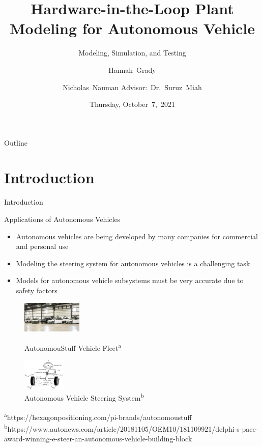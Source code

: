 \documentclass{beamer}
\title[HIL Plant Modeling]{Hardware-in-the-Loop Plant Modeling for Autonomous
  Vehicle}
\subtitle{Modeling, Simulation, and Testing}
\author[H.~Grady, N.~Nauman]{Hannah~Grady \and Nicholas~Nauman 
\linebreak Advisor:~Dr.~Suruz~Miah}
\institute[Bradley University] %
{
  Department of Electrical and Computer Engineering\\
  Bradley University\\
  1501 W. Bradley Avenue\\
  Peoria, IL, 61625, USA
}
\date[October~7,~2021]{Thursday, October~7,~2021}
\begin{document}
\begin{frame}
  \titlepage
\end{frame}

\begin{frame}{Outline} 
  \tableofcontents%
\end{frame}

\section{Introduction}

\begin{frame}{Introduction}{}
    \begin{block}{Applications of Autonomous Vehicles}
    	\begin{itemize}
    		\item Autonomous vehicles are being developed by many companies for commercial and personal use
    		\item Modeling the steering system for autonomous vehicles is a challenging task
     		\item Models for autonomous vehicle subsystems must be very accurate due to safety factors
		\end{itemize}
    \end{block}
        \begin{figure}
			\centering
			\begin{minipage}[t]{0.4\textwidth}
				\centering
				\includegraphics[height=1.5cm]{figs/img/autonomousVehiclesAStuff}
				\caption{AutonomouStuff Vehicle Fleet\textsuperscript{a}}
				\label{fig:fleet}
			\end{minipage}
			\begin{minipage}[t]{0.4\textwidth}
				\centering
				\includegraphics[height=1.5cm]{figs/img/autonomousVehiclesSteering}
				\caption{Autonomous Vehicle Steering System\textsuperscript{b}}
				\label{fig:steerSystem}
			\end{minipage}
        \end{figure}
    \begin{tiny}
		\textsuperscript{a}https://hexagonpositioning.com/pi-brands/autonomoustuff\\\textsuperscript{b}https://www.autonews.com/article/20181105/OEM10/181109921/delphi-s-pace-award-winning-e-steer-an-autonomous-vehicle-building-block
    \end{tiny}
\end{frame}
\end{document}
